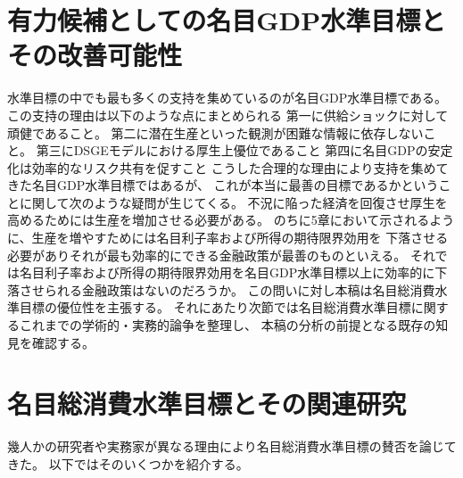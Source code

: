 \section{有力候補としての名目GDP水準目標とその改善可能性}
\label{sec:review_merits_of_ngdplt}
水準目標の中でも最も多くの支持を集めているのが名目GDP水準目標である。
この支持の理由は以下のような点にまとめられる
第一に供給ショックに対して頑健であること\parencite{Sumner2014,BhandariFrankel2017}。
第二に潜在生産といった観測が困難な情報に依存しないこと\parencite{Orphanides2003,BeckworthHendrickson2019}。
第三にDSGEモデルにおける厚生上優位であること\parencite{GarinLesterSims2016}
第四に名目GDPの安定化は効率的なリスク共有を促すこと\parencite{Sheedy2014}
こうした合理的な理由により支持を集めてきた名目GDP水準目標ではあるが、
これが本当に最善の目標であるかということに関して次のような疑問が生じてくる。
不況に陥った経済を回復させ厚生を高めるためには生産を増加させる必要がある。
のちに5章において示されるように、生産を増やすためには名目利子率および所得の期待限界効用を
下落させる必要がありそれが最も効率的にできる金融政策が最善のものといえる。
それでは名目利子率および所得の期待限界効用を名目GDP水準目標以上に効率的に下落させられる金融政策はないのだろうか。
この問いに対し本稿は名目総消費水準目標の優位性を主張する。
それにあたり次節では名目総消費水準目標に関するこれまでの学術的・実務的論争を整理し、
本稿の分析の前提となる既存の知見を確認する。

\section{名目総消費水準目標とその関連研究}
\label{sec:review_nclt_studies}
幾人かの研究者や実務家が異なる理由により名目総消費水準目標の賛否を論じてきた。
以下ではそのいくつかを紹介する。

